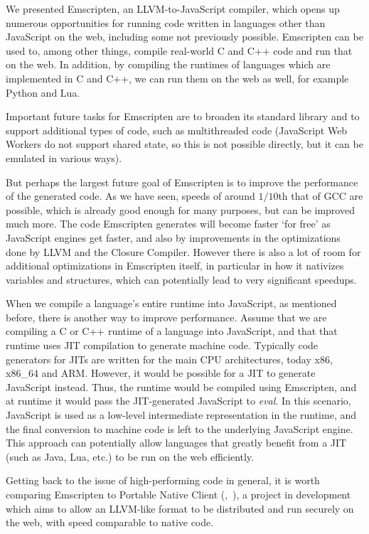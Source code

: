 \documentclass[preprint,10pt]{sigplanconf}
\begin{document}
We presented Emscripten, an LLVM-to-JavaScript compiler, which opens up
numerous opportunities for running code written in languages other
than JavaScript on the web, including some not previously possible.
Emscripten can be used to, among other
things, compile real-world C and C++ code and run that on the web. In
addition, by compiling the runtimes of languages which are implemented in C and C++,
we can run them on the web as well, for example Python and Lua.

Important future tasks for Emscripten are to broaden its
standard library and to support additional types of code, such as
multithreaded code (JavaScript Web Workers do not support shared state,
so this is not possible directly, but it can be emulated in various ways).

But perhaps the largest future goal of Emscripten is to improve the performance of
the generated code. As we have seen, speeds of around $1/10$th that of
GCC are possible, which is already good enough for many purposes, but
can be improved much more. The code Emscripten generates will become faster
`for free' as JavaScript engines get
faster, and also by improvements in the optimizations done by LLVM and the Closure
Compiler. However there is also a lot of room for additional optimizations in
Emscripten itself, in particular in how it nativizes variables and structures,
which can potentially lead to very significant speedups.

When we compile a language's entire runtime into JavaScript, as mentioned
before, there is another way to improve performance.
Assume that we are compiling a C or C++ runtime of a language
into JavaScript, and that that runtime uses JIT compilation to generate machine code. Typically
code generators for JITs are written for the main CPU architectures, today
x86, x86\_64 and ARM. However, it would be possible for a JIT to
generate JavaScript instead. Thus, the runtime would be compiled using
Emscripten, and at runtime it would pass the JIT-generated JavaScript to
\emph{eval}. In this
scenario, JavaScript is used as a low-level intermediate representation in
the runtime, and the final conversion to machine code is left to the underlying
JavaScript engine. This approach can potentially allow languages that 
greatly benefit from a JIT (such as Java, Lua, etc.) to be run on the web
efficiently.

Getting back to the issue of high-performing code in general, it is worth comparing
Emscripten to Portable Native Client (\cite{pnacl},~\cite{nacl}), a project in development which aims
to allow an LLVM-like format to be distributed and run securely
on the web, with speed comparable to native code.
\end{document}
